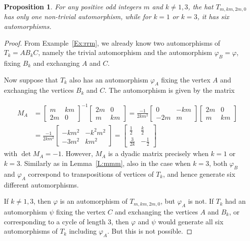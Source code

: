 \documentclass[12pt]{amsart}
\def\p{\varphi}
\theoremstyle{plain}
\newtheorem{proposition}[theorem]{Proposition}
\theoremstyle{definition}
\numberwithin{equation}{section}
\begin{document}
\begin{proposition}\label{P:sixauts}
For any positive odd integers $m$ and $k \neq 1, 3$, the hat $T_{m,km,2m,0}$ has only one
non-trivial automorphism, while for $k = 1$ or $k = 3$, it has six automorphisms.
\end{proposition}

\begin{proof}
From Example~\ref{Ex:rrm}, we already know two automorphisms of $T_k = AB_kC$, namely the
trivial automorphism and the automorphism $\p_B = \p$, fixing $B_k$ and exchanging $A$ and $C$.

Now suppose that $T_k$ also has an automorphism $\p_A$ fixing the vertex $A$ and exchanging the vertices $B_k$ and $C$. The automorphism is given by the matrix

\begin{align*}
M_A &=
	\begin{bmatrix}
		m&km\\
		2m&0
	\end{bmatrix}^{-1}
	\begin{bmatrix}
		2m&0\\
		m&km
	\end{bmatrix}
	= \frac{-1}{2km^2}	\begin{bmatrix}
		0&-km\\
		-2m&m
	\end{bmatrix}
	\begin{bmatrix}
		2m&0\\
		m&km
	\end{bmatrix}\\ &= \frac{-1}{2km^2}	\begin{bmatrix}
	-km^2&-k^2m^2\\
	-3m^2&km^2
\end{bmatrix}= 	\begin{bmatrix}
 \frac{1}{2}&\frac{k}{2}\\
\frac{3}{2k}& -\frac{1}{2}
\end{bmatrix}
\end{align*}
with $\det M_A = -1$. However, $M_A$ is a dyadic matrix precisely when $k = 1$ or $k = 3$.
Similarly as in Lemma~\ref{L:mmm}, also in the case when $k = 3$, both $\p_B$ and $\p_A$
correspond to transpositions of vertices of $T_k$, and hence generate six different
automorphisms.

If $k \neq 1, 3$, then $\p$ is an automorphism of $T_{m,km,2m,0}$, but $\p_A$ is not.
If $T_k$ had an automorphism $\psi$ fixing the vertex $C$ and exchanging the vertices $A$ and $B_k$, or corresponding to a  cycle of length $3$, then $\p$ and $\psi$ would generate all six automorphisms of $T_k$ including $\p_A$. But this is not possible.
\end{proof}
\end{document}
